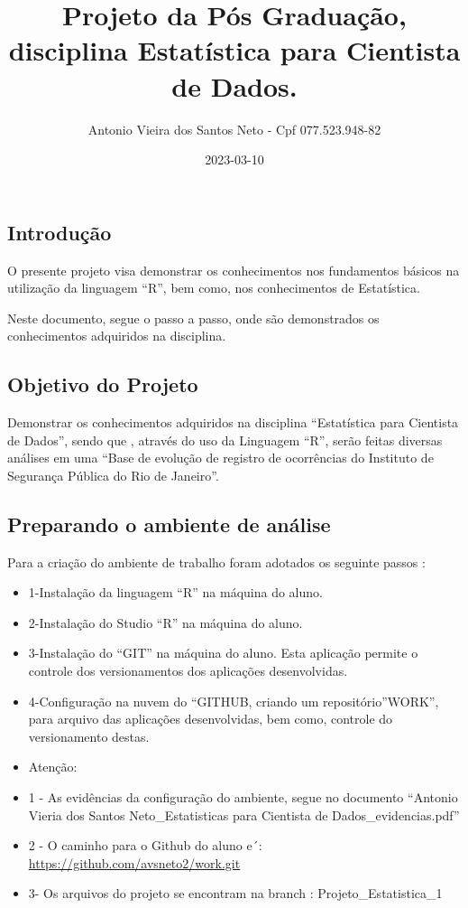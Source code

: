\documentclass[
]{article}
\title{Projeto da Pós Graduação, disciplina Estatística para Cientista de Dados.}
\author{Antonio Vieira dos Santos Neto - Cpf 077.523.948-82}
\date{2023-03-10}
\begin{document}
\maketitle

{
\setcounter{tocdepth}{2}
\tableofcontents
}
\hypertarget{introduuxe7uxe3o}{%
\subsection{Introdução}\label{introduuxe7uxe3o}}

O presente projeto visa demonstrar os conhecimentos nos fundamentos básicos na utilização da linguagem ``R'', bem como, nos conhecimentos de Estatística.

Neste documento, segue o passo a passo, onde são demonstrados os conhecimentos adquiridos na disciplina.

\hypertarget{objetivo-do-projeto}{%
\subsection{Objetivo do Projeto}\label{objetivo-do-projeto}}

Demonstrar os conhecimentos adquiridos na disciplina ``Estatística para Cientista de Dados'', sendo que , através do uso da Linguagem ``R'', serão feitas diversas análises em uma ``Base de evolução de registro de ocorrências do Instituto de Segurança Pública do Rio de Janeiro''.

\hypertarget{preparando-o-ambiente-de-anuxe1lise}{%
\subsection{Preparando o ambiente de análise}\label{preparando-o-ambiente-de-anuxe1lise}}

Para a criação do ambiente de trabalho foram adotados os seguinte passos :

\begin{itemize}
\item
  1-Instalação da linguagem ``R'' na máquina do aluno.
\item
  2-Instalação do Studio ``R'' na máquina do aluno.
\item
  3-Instalação do ``GIT'' na máquina do aluno. Esta aplicação permite o controle dos versionamentos dos aplicações desenvolvidas.
\item
  4-Configuração na nuvem do ``GITHUB, criando um repositório''WORK'', para arquivo das aplicações desenvolvidas, bem como, controle do versionamento destas.
\item
  Atenção:
\item
  1 - As evidências da configuração do ambiente, segue no documento ``Antonio Vieria dos Santos Neto\_Estatisticas para Cientista de Dados\_evidencias.pdf''
\item
  2 - O caminho para o Github do aluno e´: \url{https://github.com/avsneto2/work.git}
\item
  3- Os arquivos do projeto se encontram na branch : Projeto\_Estatistica\_1
\end{itemize}
\end{document}
